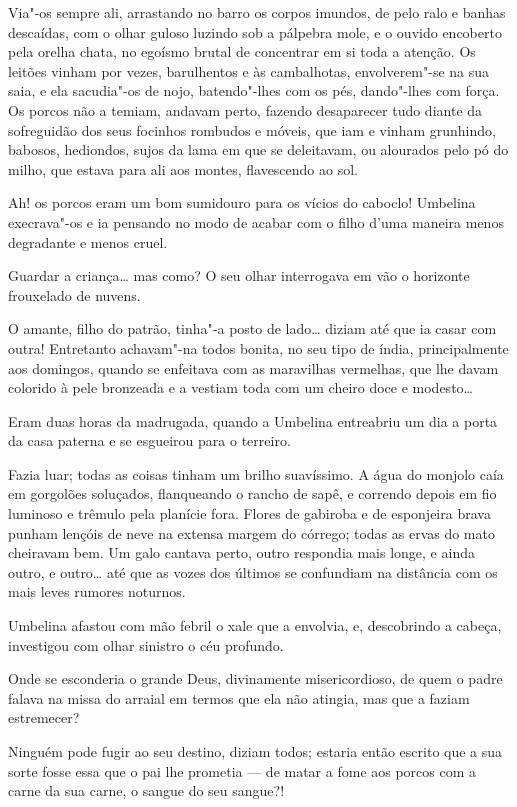 Via"-os sempre ali, arrastando no barro os corpos imundos, de pelo ralo e
banhas descaídas, com o olhar guloso luzindo sob a pálpebra mole, e o
ouvido encoberto pela orelha chata, no egoísmo brutal de concentrar em
si toda a atenção. Os leitões vinham por vezes, barulhentos e às
cambalhotas, envolverem"-se na sua saia, e ela sacudia"-os de nojo,
batendo"-lhes com os pés, dando"-lhes com força. Os porcos não a temiam,
andavam perto, fazendo desaparecer tudo diante da sofreguidão dos seus
focinhos rombudos e móveis, que iam e vinham grunhindo, babosos,
hediondos, sujos da lama em que se deleitavam, ou alourados pelo pó do
milho, que estava para ali aos montes, flavescendo ao sol.

Ah! os porcos eram um bom sumidouro para os vícios do caboclo! Umbelina
execrava"-os e ia pensando no modo de acabar com o filho d'uma maneira
menos degradante e menos cruel.

Guardar a criança\ldots{} mas como? O seu olhar interrogava em vão o
horizonte frouxelado de nuvens.

O amante, filho do patrão, tinha"-a posto de lado\ldots{} diziam até que ia
casar com outra! Entretanto achavam"-na todos bonita, no seu tipo de
índia, principalmente aos domingos, quando se enfeitava com as
maravilhas vermelhas, que lhe davam colorido à pele bronzeada e a
vestiam toda com um cheiro doce e modesto\ldots{}

Eram duas horas da madrugada, quando a Umbelina entreabriu um dia a
porta da casa paterna e se esgueirou para o terreiro.

Fazia luar; todas as coisas tinham um brilho suavíssimo. A água do
monjolo caía em gorgolões soluçados, flanqueando o rancho de sapê, e
correndo depois em fio luminoso e trêmulo pela planície fora. Flores de
gabiroba e de esponjeira brava punham lençóis de neve na extensa margem
do córrego; todas as ervas do mato cheiravam bem. Um galo cantava perto,
outro respondia mais longe, e ainda outro, e outro\ldots{} até que as vozes
dos últimos se confundiam na distância com os mais leves rumores
noturnos.

Umbelina afastou com mão febril o xale que a envolvia, e, descobrindo a
cabeça, investigou com olhar sinistro o céu profundo.

Onde se esconderia o grande Deus, divinamente misericordioso, de quem o
padre falava na missa do arraial em termos que ela não atingia, mas que
a faziam estremecer?

Ninguém pode fugir ao seu destino, diziam todos; estaria então escrito
que a sua sorte fosse essa que o pai lhe prometia --- de matar a fome
aos porcos com a carne da sua carne, o sangue do seu sangue?!


